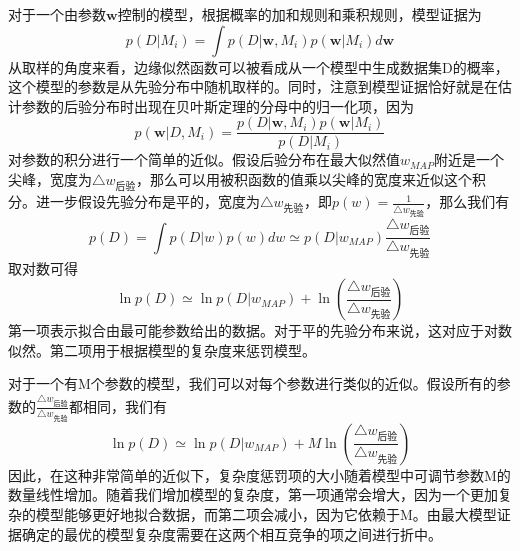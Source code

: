对于一个由参数$\boldsymbol{w}$控制的模型，根据概率的加和规则和乘积规则，模型证据为
\begin{equation}
	p(D|M_i)=\int p(D|\boldsymbol{w},M_i)p(\boldsymbol{w}|M_i)d\boldsymbol{w}
\end{equation}
从取样的角度来看，边缘似然函数可以被看成从一个模型中生成数据集D的概率，这个模型的参数是从先验分布中随机取样的。同时，注意到模型证据恰好就是在估计参数的后验分布时出现在贝叶斯定理的分母中的归一化项，因为 
\begin{equation}
	p(\boldsymbol{w}|D,M_i)=\frac{p(D|\boldsymbol{w},M_i)p(\boldsymbol{w}|M_i)}{p(D|M_i)}
\end{equation}
对参数的积分进行一个简单的近似。假设后验分布在最大似然值$w_{MAP}$附近是一个尖峰，宽度为$\triangle w_{\text{后验}}$，那么可以用被积函数的值乘以尖峰的宽度来近似这个积分。进一步假设先验分布是平的，宽度为$\triangle w_{\text{先验}}$，即$p(w)=\frac{1}{\triangle w_{\text{先验}}}$，那么我们有
\begin{equation}
	p(D)=\int p(D|w)p(w)dw\simeq p(D|w_{MAP})\frac{\triangle w_{\text{后验}}}{\triangle w_{\text{先验}}}
\end{equation}
取对数可得
\begin{equation}
	\ln p(D)\simeq \ln p(D|w_{MAP})+\ln \left(\frac{\triangle w_{\text{后验}}}{\triangle w_{\text{先验}}} \right)
\end{equation}
第一项表示拟合由最可能参数给出的数据。对于平的先验分布来说，这对应于对数似然。第二项用于根据模型的复杂度来惩罚模型。

对于一个有M个参数的模型，我们可以对每个参数进行类似的近似。假设所有的参数的$\frac{\triangle w_{\text{后验}}}{\triangle w_{\text{先验}}}$都相同，我们有
\begin{equation}
\ln p(D)\simeq \ln p(D|w_{MAP})+M\ln \left(\frac{\triangle w_{\text{后验}}}{\triangle w_{\text{先验}}} \right)
\end{equation}
因此，在这种非常简单的近似下，复杂度惩罚项的大小随着模型中可调节参数M的数量线性增加。随着我们增加模型的复杂度，第一项通常会增大，因为一个更加复杂的模型能够更好地拟合数据，而第二项会减小，因为它依赖于M。由最大模型证据确定的最优的模型复杂度需要在这两个相互竞争的项之间进行折中。